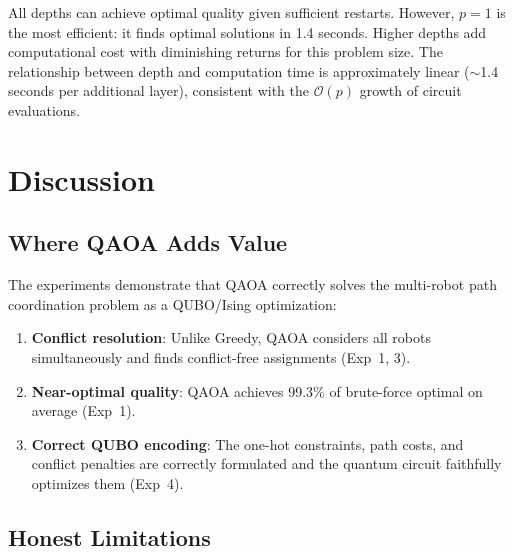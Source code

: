\documentclass[conference]{IEEEtran}
\begin{document}
All depths can achieve optimal quality given sufficient restarts. However, $p=1$ is the most efficient: it finds optimal solutions in 1.4 seconds. Higher depths add computational cost with diminishing returns for this problem size. The relationship between depth and computation time is approximately linear ($\sim$1.4 seconds per additional layer), consistent with the $\mathcal{O}(p)$ growth of circuit evaluations.

\section{Discussion}
\label{sec:discussion}

\subsection{Where QAOA Adds Value}

The experiments demonstrate that QAOA correctly solves the multi-robot path coordination problem as a QUBO/Ising optimization:

\begin{enumerate}
    \item \textbf{Conflict resolution}: Unlike Greedy, QAOA considers all robots simultaneously and finds conflict-free assignments (Exp~1, 3).
    \item \textbf{Near-optimal quality}: QAOA achieves 99.3\% of brute-force optimal on average (Exp~1).
    \item \textbf{Correct QUBO encoding}: The one-hot constraints, path costs, and conflict penalties are correctly formulated and the quantum circuit faithfully optimizes them (Exp~4).
\end{enumerate}

\subsection{Honest Limitations}
\end{document}
